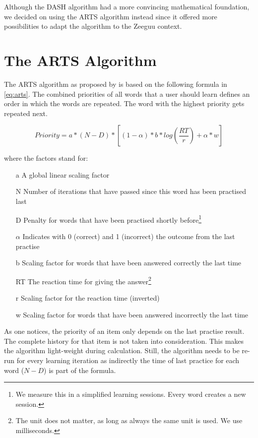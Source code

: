 \documentclass{article}
\begin{document}
Although the DASH algorithm had a more convincing mathematical foundation, we decided on using the ARTS algorithm instead since it offered more possibilities to adapt the algorithm to the Zeeguu context.

\section{The ARTS Algorithm}
The ARTS algorithm as proposed by \cite{mettler2014adaptive} is based on the following formula in \autoref{eq:arts}. The combined priorities of all words that a user should learn defines an order in which the words are repeated. The word with the highest priority gets repeated next.

\begin{equation}\label{eq:arts}
Priority = a * (N-D) * [(1 - \alpha) * b * log(\frac{RT}{r}) + \alpha * w]
\end{equation}

where the factors stand for:
\begin{enumerate}
    \item[a] A global linear scaling factor
    \item[N] Number of iterations that have passed since this word has been practised last
    \item[D] Penalty for words that have been practised shortly before\footnote{We measure this in a simplified learning sessions. Every word creates a new session.}
    \item[$\alpha$] Indicates with 0 (correct) and 1 (incorrect) the outcome from the last practise
    \item[b] Scaling factor for words that have been answered correctly the last time
    \item[RT] The reaction time for giving the answer\footnote{The unit does not matter, as long as always the same unit is used. We use milliseconds.}
    \item[r] Scaling factor for the reaction time (inverted)
    \item[w] Scaling factor for words that have been answered incorrectly the last time
\end{enumerate}

As one notices, the priority of an item only depends on the last practise result. The complete history for that item is not taken into consideration. This makes the algorithm light-weight during calculation. Still, the algorithm needs to be re-run for every learning iteration as indirectly the time of last practice for each word ($N-D$) is part of the formula.
\end{document}
